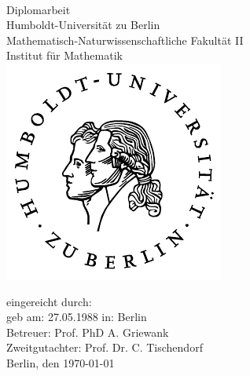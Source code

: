 \begin{spacing}{1}
\begin{titlepage}
\begin{otherlanguage}{ngerman}
\enlargethispage{4\baselineskip}
\vspace{3cm}
\begin{center}
	\Huge{\bfseries\thetitle}\\[1cm]
	\LARGE{Diplomarbeit}\\[1cm]
	\normalsize{
	Humboldt-Universität zu Berlin\\
	Mathematisch-Naturwissenschaftliche Fakultät II\\
	Institut für Mathematik\\[1cm]
	}
	\includegraphics[height=0.3\textheight]{img/plain/husiegel.pdf}\\[0.5cm]
\end{center}
\vfill

\begin{flushleft}
\large{
eingereicht durch: \theauthor\\
geb am: 27.05.1988 \quad in: Berlin\\
Betreuer: Prof. PhD A. Griewank\\
Zweitgutachter: Prof. Dr. C. Tischendorf\\
Berlin, den \today
}
\end{flushleft}
\end{otherlanguage}
\end{titlepage}
\tableofcontents
\end{spacing}